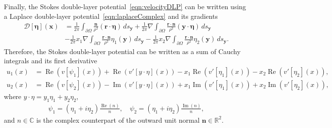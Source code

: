 \documentclass[preprint, superscriptaddress, notitlepage]{revtex4-1}
\newcommand{\Real}{\Re}
\newcommand{\Imag}{\Im}
\newcommand{\bd}{{\partial}}
\newcommand{\CC}{{\mathbb{C}}}
\newcommand{\DDD}{{\boldsymbol{\mathcal D}}}
\newcommand{\eeta}{{\boldsymbol\eta}}
\newcommand{\nn}{{\mathbf{n}}}
\newcommand{\rr}{{\mathbf{r}}}
\renewcommand{\Re}{{\operatorname{Re}}}
\renewcommand{\Im}{{\operatorname{Im}}}
\newcommand{\RR}{{\mathbb{R}}}
\newcommand{\xx}{{\mathbf{x}}}
\newcommand{\yy}{{\mathbf{y}}}
\begin{document}
Finally, the Stokes double-layer potential~\eqref{eqn:velocityDLP} can
be written using a Laplace double-layer
potential~\eqref{eqn:laplaceComplex} and its gradients 
\begin{equation}
  \label{eqn:Stokes2Laplace}
  \begin{aligned}
    \DDD[\eeta](\xx) &= 
      \frac{1}{2\pi} \int_{\bd\Omega} 
        \frac{\nn}{\rho^2} (\rr \cdot \eeta) \, ds_\yy + 
      \frac{1}{2\pi} \nabla \int_{\bd\Omega}
        \frac{\rr \cdot \nn}{\rho^2} (\yy \cdot \eeta) \, ds_\yy \\
      &- \frac{1}{2\pi} x_1 \nabla \int_{\bd\Omega}
        \frac{\rr \cdot \nn}{\rho^2}\eta_1(\yy) \, ds_\yy -
      \frac{1}{2\pi} x_2 \nabla \int_{\bd\Omega}
        \frac{\rr \cdot \nn}{\rho^2}\eta_2(\yy) \, ds_\yy.
  \end{aligned}
\end{equation}
Therefore, the Stokes double-layer potential can be written as a sum of
Cauchy integrals and its first derivative~\citep{bar-wu-vee2015}
\begin{equation}
  \begin{aligned}
    u_1(x) &= \Real (v[\psi_1](x)) + \Real (v'[y\cdot\eta](x)) 
             -x_1\Real (v'[\eta_1](x)) - x_2\Real (v'[\eta_2](x)), \\
    u_2(x) &= \Real (v[\psi_2](x)) - \Imag (v'[y\cdot\eta](x)) 
         +x_1\Imag (v'[\eta_1](x)) + x_2\Imag (v'[\eta_2](x)),
  \end{aligned}
  \label{eqn:cauchyVelocity}
\end{equation}
where $y \cdot \eta = y_1 \eta_1 + y_2 \eta_2$, 
\begin{align} 
  \psi_1=(\eta_1+i\eta_2)\frac{\Real(n)}{n}, \quad
  \psi_2=(\eta_1+i\eta_2)\frac{\Imag(n)}{n},
\end{align}
and $n \in \CC$ is the complex counterpart of the outward unit normal
$\nn \in \RR^2$.

\end{document}
